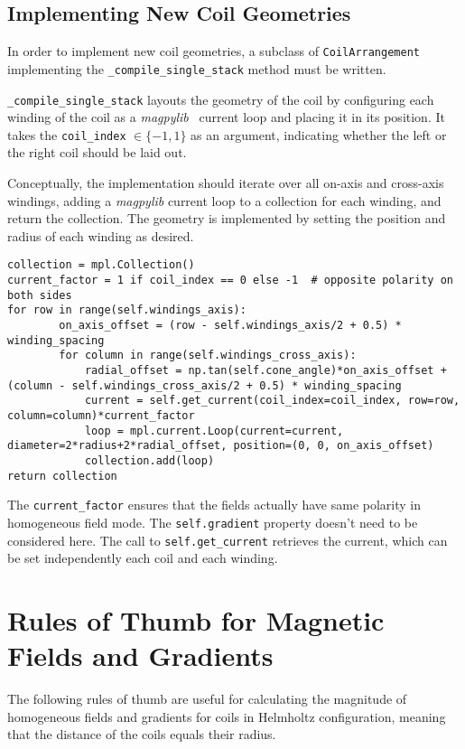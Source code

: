 \section*{Implementing New Coil Geometries}
In order to implement new coil geometries, a subclass of \texttt{CoilArrangement} implementing the \texttt{\_compile\_single\_stack} method must be written.

\texttt{\_compile\_single\_stack} layouts the geometry of the coil by configuring each winding of the coil as a \textit{magpylib}~\cite{noauthor_magpylibmagpylib_nodate} current loop and placing it in its position. It takes the \texttt{coil\_index} $\in \{-1, 1\}$ as an argument, indicating whether the left or the right coil should be laid out.

Conceptually, the implementation should iterate over all on-axis and cross-axis windings, adding a \textit{magpylib} current loop to a collection for each winding, and return the collection. The geometry is implemented by setting the position and radius of each winding as desired.
\begin{lstlisting}
collection = mpl.Collection()
current_factor = 1 if coil_index == 0 else -1  # opposite polarity on both sides
for row in range(self.windings_axis):
        on_axis_offset = (row - self.windings_axis/2 + 0.5) * winding_spacing
        for column in range(self.windings_cross_axis):
            radial_offset = np.tan(self.cone_angle)*on_axis_offset + (column - self.windings_cross_axis/2 + 0.5) * winding_spacing
            current = self.get_current(coil_index=coil_index, row=row, column=column)*current_factor
            loop = mpl.current.Loop(current=current, diameter=2*radius+2*radial_offset, position=(0, 0, on_axis_offset)
            collection.add(loop)
return collection
\end{lstlisting}
The \texttt{current\_factor} ensures that the fields actually have same polarity in homogeneous field mode. The \texttt{self.gradient} property doesn't need to be considered here. The call to \texttt{self.get\_current} retrieves the current, which can be set independently each coil and each winding.



\chapter{Rules of Thumb for Magnetic Fields and Gradients}
The following rules of thumb are useful for calculating the magnitude of homogeneous fields and gradients for coils in Helmholtz configuration, meaning that the distance of the coils equals their radius.

